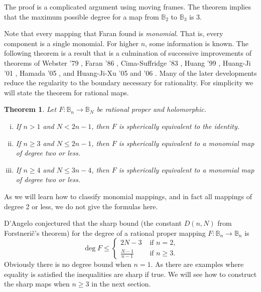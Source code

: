 \documentclass[12pt,openany]{book}
\newcommand{\bB}{{\mathbb{B}}}
\theoremstyle{plain}
\newtheorem{thm}{Theorem}[section]
\theoremstyle{remark}
\theoremstyle{definition}
\theoremstyle{exercise}
\theoremstyle{example}
\begin{document}
The proof is a complicated argument using moving frames.  The theorem
implies that the
maximum possible degree for a map from $\bB_2$ to $\bB_3$ is 3.

Note that every mapping that Faran found
is \emph{monomial}.  That is, every component is a
single monomial.  For higher $n$, some information is known.  The following
theorem is a result that is a culmination of successive improvements of
theorems of Webster '79 \cite{Webster79},
Faran '86 \cite{Faran86}, Cima-Suffridge '83 \cite{CS83},
Huang '99 \cite{Huang99}, Huang-Ji '01 \cite{HJ01}, Hamada '05 \cite{Hamada},
and Huang-Ji-Xu '05 and '06 \cite{HJX}.
Many
of the later developments
reduce the regularity to the boundary
necessary for rationality.
For simplicity we will state the theorem for rational maps.

\begin{thm}
Let $F \colon \bB_n \to \bB_N$ be rational proper and holomorphic.
\begin{enumerate}[(i)]
\item If $n > 1$ and $N < 2n-1$, then $F$ is spherically
equivalent to the identity.
\item If $n \geq 3$ and $N \leq 2n-1$, then $F$ is spherically
equivalent to a monomial map of degree two or less.
\item If $n \geq 4$ and $N \leq 3n-4$, then $F$ is spherically
equivalent to a monomial map of degree two or less.
\end{enumerate}
\end{thm}

As we will learn how to classify monomial mappings, and in fact all mappings
of degree 2 or less, we do not give the formulas here.

D'Angelo
conjectured that the sharp bound
(the constant $D(n,N)$ from Forstneri\v{c}'s theorem)
for the degree of a rational proper mapping
$F \colon \bB_n \to \bB_n$ is
\begin{equation}
\deg F \leq
\begin{cases}
2N-3 & \text{ if $n=2$,} \\
\frac{N-1}{n-1} & \text{ if $n\geq 3$.}
\end{cases}
\end{equation}
Obviously there is no degree bound when $n=1$.  As there are examples where
equality is satisfied the inequalities are sharp if true.  We will see how
to construct the sharp maps when $n \geq 3$ in the next section.

\end{document}
